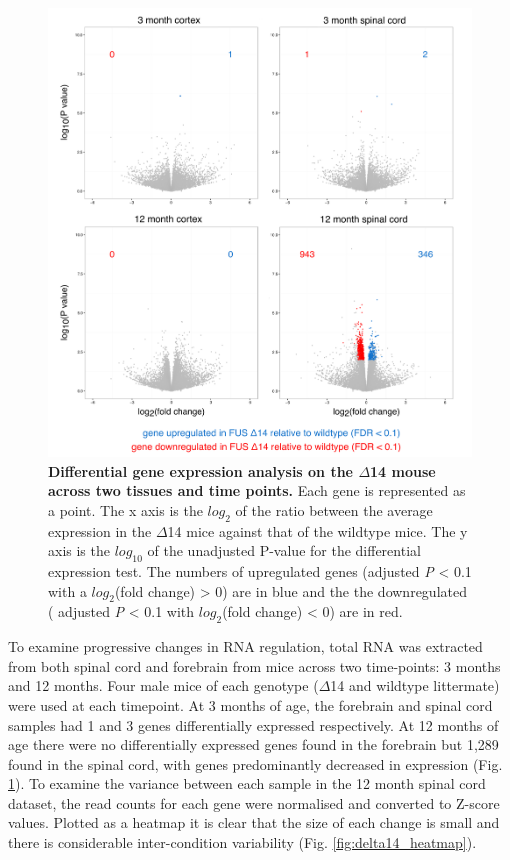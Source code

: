 \begin{figure}[h!]
	\centering
	\includegraphics[width=\textwidth]{Figures/04_fus_mice/anny_volcanos.png}
	\caption[Differential gene expression analysis on the $\Delta$14 mouse]{
		\textbf{Differential gene expression analysis on the $\Delta$14 mouse across two tissues and time points.}
		Each gene is represented as a point. The x axis is the $log_2$ of the ratio between the average expression in the $\Delta$14 mice against that of the wildtype mice. The y axis is the $log_10$ of the unadjusted P-value for the differential expression test. The numbers of upregulated genes (adjusted \textit{P} < 0.1 with a $log_2$(fold change) > 0) are in blue and the the downregulated ( adjusted \textit{P} < 0.1 with $log_2$(fold change) < 0) are in red.
	}
	\label{fig:delta14_volcanos}
\end{figure}

To examine progressive changes in RNA regulation, total RNA was extracted from both spinal cord and forebrain from mice across two time-points: 3 months and 12 months. Four male mice of each genotype ($\Delta$14 and wildtype littermate) were used at each timepoint. At 3 months of age, the forebrain and spinal cord samples had 1 and 3 genes differentially expressed respectively. At 12 months of age there were no differentially expressed genes found in the forebrain but 1,289 found in the spinal cord, with genes predominantly decreased in expression (Fig. \ref{fig:delta14_volcanos}). To examine the variance between each sample in the 12 month spinal cord dataset, the read counts for each gene were normalised and converted to Z-score values. Plotted as a heatmap it is clear that the size of each change is small and there is considerable inter-condition variability (Fig. \ref{fig:delta14_heatmap}).


